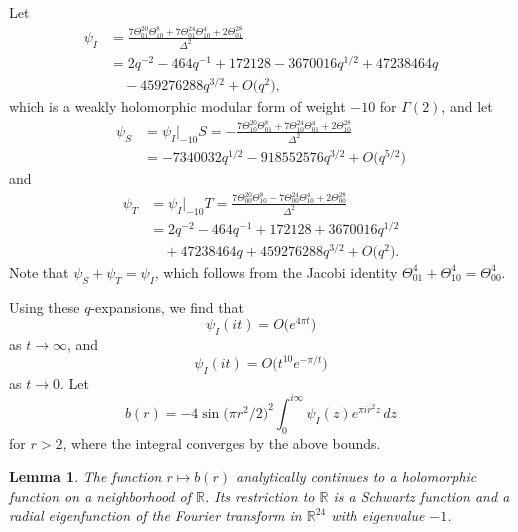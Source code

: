 \documentclass{aomart}
\theoremstyle{plain}
\newtheorem{lemma}[theorem]{Lemma}
\numberwithin{theorem}{section}
\numberwithin{equation}{section}
\newcommand{\R}{{\mathbb R}}
\begin{document}
Let
\begin{equation} \label{eq:psiIdef}
\begin{split}
\psi_I &= \frac{7 \Theta_{01}^{20} \Theta_{10}^8 + 7 \Theta_{01}^{24} \Theta_{10}^4 + 2 \Theta_{01}^{28}}{\Delta^2}\\
&= 2q^{-2} - 464q^{-1} + 172128 - 3670016q^{1/2} + 47238464q\\
& \quad \phantom{}  - 459276288q^{3/2}  + O\big(q^2\big),
\end{split}
\end{equation}
which is a weakly holomorphic modular form of weight $-10$ for $\Gamma(2)$,
and let
\begin{equation} \label{eq:psiSdef}
\begin{split}
\psi_S &= \psi_I |_{-10} S = -\frac{7 \Theta_{10}^{20} \Theta_{01}^8 + 7 \Theta_{10}^{24} \Theta_{01}^4 + 2 \Theta_{10}^{28}}{\Delta^2}\\
& = -7340032q^{1/2} - 918552576q^{3/2} + O\big(q^{5/2}\big)
\end{split}
\end{equation}
and
\begin{align*}
\psi_T &= \psi_I |_{-10} T = \frac{7 \Theta_{00}^{20} \Theta_{10}^8 - 7 \Theta_{00}^{24} \Theta_{10}^4 + 2 \Theta_{00}^{28}}{\Delta^2}\\
& = 2q^{-2} - 464q^{-1} + 172128 + 3670016q^{1/2}\\
& \quad \phantom{} + 47238464q + 459276288q^{3/2} + O\big(q^2\big).
\end{align*}
Note that $\psi_S + \psi_T = \psi_I$, which follows from the Jacobi identity
${\Theta_{01}^4 + \Theta_{10}^4 = \Theta_{00}^4}$.

Using these $q$-expansions, we find that
\begin{equation} \label{eq:psitinfinity}
\psi_I(it) = O\big(e^{4\pi t}\big)
\end{equation}
as $t \to \infty$, and
\begin{equation} \label{eq:psitzero}
\psi_I(it) = O\big(t^{10} e^{-\pi/t}\big)
\end{equation}
as $t \to 0$.  Let
\[
b(r) = -4 \sin\mathopen{}\big(\pi r^2/2\big)^2\mathclose{} \int_0^{i \infty} \psi_I(z) e^{\pi i r^2 z} \, dz
\]
for $r>2$, where the integral converges by the above bounds.

\begin{lemma} \label{lemma:minusone}
The function $r \mapsto b(r)$ analytically continues to a holomorphic
function on a neighborhood of $\R$.  Its restriction to $\R$ is a Schwartz
function and a radial eigenfunction of the Fourier transform in $\R^{24}$
with eigenvalue $-1$.
\end{lemma}
\end{document}
